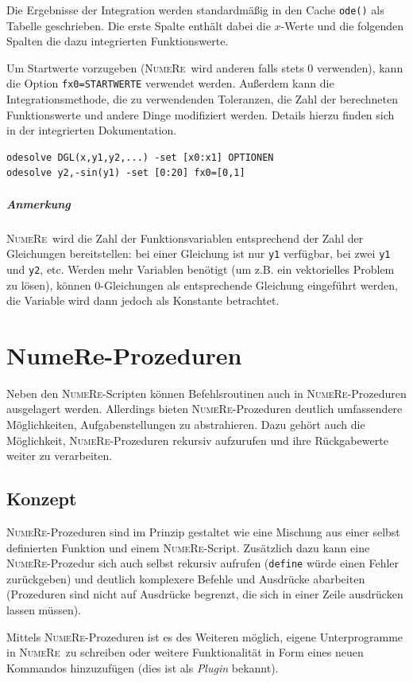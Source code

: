 \documentclass[DIV=14,headsepline,footsepline]{scrbook}
\newcommand{\NR}{\textsc{Nu\-me\-Re}}
\begin{document}
				Die Ergebnisse der Integration werden standardmäßig in den Cache \verb+ode()+ als Tabelle geschrieben. Die erste Spalte enthält dabei die $x$-Werte und die folgenden Spalten die dazu integrierten Funktionswerte.
				
				Um Startwerte vorzugeben (\NR\ wird anderen falls stets 0 verwenden), kann die Option \verb+fx0=STARTWERTE+ verwendet werden. Außerdem kann die Integrationsmethode, die zu verwendenden Toleranzen, die Zahl der berechneten Funktionswerte und andere Dinge modifiziert werden. Details hierzu finden sich in der integrierten Dokumentation.
				\begin{lstlisting}
odesolve DGL(x,y1,y2,...) -set [x0:x1] OPTIONEN
odesolve y2,-sin(y1) -set [0:20] fx0=[0,1]
				\end{lstlisting}
				\paragraph{Anmerkung}\NR\ wird die Zahl der Funktionsvariablen entsprechend der Zahl der Gleichungen bereitstellen: bei einer Gleichung ist nur \verb+y1+ verfügbar, bei zwei \verb+y1+ und \verb+y2+, etc. Werden mehr Variablen benötigt (um z.B. ein vektorielles Problem zu lösen), können 0-Gleichungen als entsprechende Gleichung eingeführt werden, die Variable wird dann jedoch als Konstante betrachtet.
				
		\chapter{NumeRe-Prozeduren}
			Neben den \NR-Scripten können Befehlsroutinen auch in \NR-Prozeduren ausgelagert werden. Allerdings bieten \NR-Prozeduren deutlich umfassendere Möglichkeiten, Aufgabenstellungen zu abstrahieren. Dazu gehört auch die Möglichkeit, \NR-Prozeduren rekursiv aufzurufen und ihre Rückgabewerte weiter zu verarbeiten.
			\section{Konzept}
				\NR-Prozeduren sind im Prinzip gestaltet wie eine Mischung aus einer selbst definierten Funktion und einem \NR-Script. Zusätzlich dazu kann eine \NR-Prozedur sich auch selbst rekursiv aufrufen (\verb+define+ würde einen Fehler zurückgeben) und deutlich komplexere Befehle und Ausdrücke abarbeiten (Prozeduren sind nicht auf Ausdrücke begrenzt, die sich in einer Zeile ausdrücken lassen müssen).
				
				Mittels \NR-Prozeduren ist es des Weiteren möglich, eigene Unterprogramme in \NR\ zu schreiben oder weitere Funktionalität in Form eines neuen Kommandos hinzuzufügen (dies ist als \emph{Plugin} bekannt).
				
\end{document}

